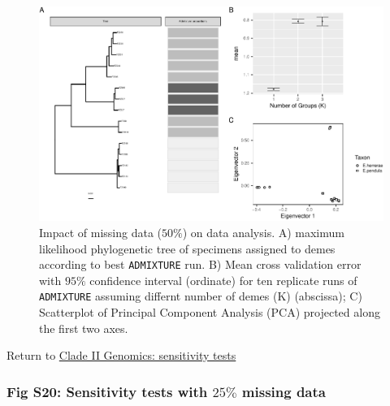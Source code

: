 \documentclass[
  11pt,
]{article}
\begin{document}
\begin{figure}
\includegraphics{Supplementary_Material_files/figure-latex/cladeIIgenomicSensitivityAnalysesMiddleplots-1} \caption{Impact of missing data ($50\%$) on data analysis. A) maximum likelihood phylogenetic tree of specimens assigned to demes according to best \texttt{ADMIXTURE} run. B) Mean cross validation error with $95\%$ confidence interval (ordinate) for ten replicate runs of \texttt{ADMIXTURE} assuming differnt number of demes (K) (abscissa); C) Scatterplot of Principal Component Analysis (PCA) projected along the first two axes.}\label{fig:cladeIIgenomicSensitivityAnalysesMiddleplots}
\end{figure}

Return to \protect\hyperlink{sensitivity-tests-1}{Clade II Genomics: sensitivity tests}
\pagebreak

\hypertarget{fig-s20-sensitivity-tests-with-25-missing-data}{%
\subsubsection{\texorpdfstring{Fig S20: Sensitivity tests with \(25\%\) missing data}{Fig S20: Sensitivity tests with 25\textbackslash\% missing data}}\label{fig-s20-sensitivity-tests-with-25-missing-data}}
\end{document}
